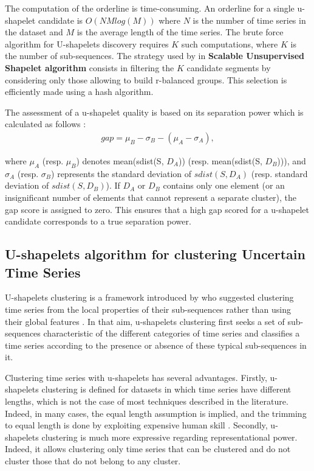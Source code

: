 The computation of the orderline is time-consuming. An orderline for a single u-shapelet candidate is $O(NMlog(M))$ where $N$ is the number of time series in the dataset and $M$ is the average length of the time series. The brute force algorithm for U-shapelets discovery requires $K$ such computations, where $K$ is the number of sub-sequences. The strategy used by \cite{ulanova2015scalable} in \textbf{Scalable Unsupervised Shapelet algorithm} consists in filtering the $K$ candidate segments  by considering only those allowing to build r-balanced groups.  This selection is  efficiently made using a hash algorithm.       


The assessment of a u-shapelet quality is based on its separation power which is calculated as follows :
\begin{eqnarray}
gap=\mu_{B}-\sigma_{B}-(\mu_{A}-\sigma_{A}),
\end{eqnarray}


where $\mu_{A}$ (resp. $\mu_{B}$) denotes mean(sdist(S, $D_A$)) (resp. mean(sdist(S, $D_B$))), and
$\sigma_{A}$ (resp. $\sigma_{B}$) represents the standard deviation of $sdist(S,
D_A)$ (resp. standard deviation of $sdist(S, D_B)$).
If $D_A$ or $D_B$ contains only one element (or an insignificant number of elements that cannot represent a separate cluster), the gap score is assigned to zero. This ensures that a  high gap scored for a u-shapelet candidate corresponds to a true separation power.



\subsection{U-shapelets algorithm for clustering Uncertain Time Series }

U-shapelets clustering is a framework introduced by \cite{zakaria2012clustering} who suggested clustering time series from the local properties of their sub-sequences rather than
using their global features  \cite{zhang2016unsupervised}. In that aim, u-shapelets clustering first seeks a set of sub-sequences characteristic of the different categories of time series and classifies a time series according to the presence or absence of these typical sub-sequences in it. 

Clustering time series with u-shapelets has several advantages. Firstly, u-shapelets clustering is defined for datasets in which  time series have different lengths, which is not the case of most techniques described in the literature. Indeed, in many cases, the equal length assumption is implied,
and the trimming to equal length is done by exploiting expensive human skill \cite{ulanova2015scalable}.  Secondly, u-shapelets clustering is much more expressive regarding representational power. Indeed, it allows clustering only time series that can be
clustered and do not cluster those that do not belong to any cluster.

